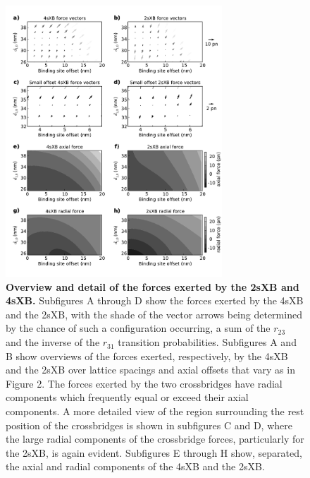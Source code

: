 \documentclass[]{article}
\begin{document}
\begin{figure}[htbp]
    \begin{center}
    \includegraphics[width=3.2in]{../imgs/Figure4.pdf}
    \caption{
        \label{fig_forces}
        \textbf{Overview and detail of the forces exerted by the 2sXB and 4sXB.}
        Subfigures A through D show the forces exerted by the 4sXB and the 2sXB, with the shade of the vector arrows being determined by the chance of such a configuration occurring, a sum of the $r_{23}$ and the inverse of the $r_{31}$ transition probabilities. 
        Subfigures A and B show overviews of the forces exerted, respectively, by the 4sXB and the 2sXB over lattice spacings and axial offsets that vary as in Figure 2.
        The forces exerted by the two crossbridges have radial components which frequently equal or exceed their axial components.
        A more detailed view of the region surrounding the rest position of the crossbridges is shown in subfigures C and D, where the large radial components of the crossbridge forces, particularly for the 2sXB, is again evident.
        Subfigures E through H show, separated, the axial and radial components of the 4sXB and the 2sXB.
    }
    \end{center}
\end{figure}

\clearpage


\end{document}
